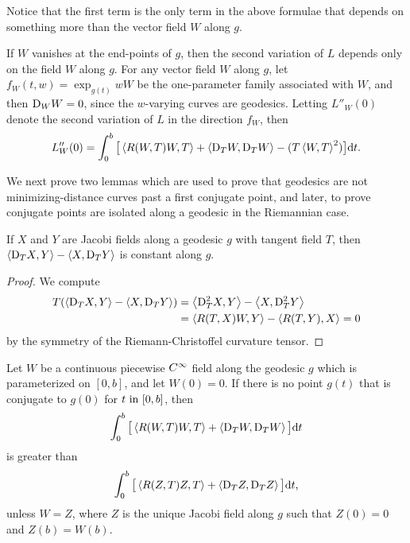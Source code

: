 \documentclass[../main]{subfiles}
\begin{document}
Notice that the first term is the only term in the above formulae that depends on something more than the vector field $W$ along $g$.



\begin{corollary} \label{cor:ch10.2.7}
    If $W$ vanishes at the end-points of $g$, then the second variation of $L$ depends only on the field $W$ along $g$. For any vector field $W$ along $g$, let $f_W(t, w) = \exp_{g(t)}wW$ be the  one-parameter family associated with $W$, and then $\mathrm{D}_W W = 0$, since the $w$-varying curves are geodesics. Letting $L''_W(0)$ denote the second variation of $L$ in the direction $f_W$, then
    \[ L''_W(0) = \int_0^b \big[\left\langle R(W, T)W,T\right\rangle + \left\langle\mathrm{D}_T W,\mathrm{D}_T W\right\rangle - (T\left\langle W,T\right\rangle^2)\big] \mathrm{d}t\text{.} \]
\end{corollary}



We next prove two lemmas which are used to prove that geodesics are not minimizing-distance curves past a first conjugate point, and later, to prove conjugate points are isolated along a geodesic in the Riemannian case.



\begin{lemma} \label{lem:ch10.2.8}
    If $X$ and $Y$ are Jacobi fields along a geodesic $g$ with tangent field $T$, then $\left\langle\mathrm{D}_T X,Y\right\rangle - \left\langle X,\mathrm{D}_T Y\right\rangle$ is constant along $g$.
\end{lemma}

\begin{proof}
    We compute
    \begin{align*}
        T(\left\langle\mathrm{D}_T X,Y\right\rangle - \left\langle X,\mathrm{D}_T Y\right\rangle) &= \left\langle\mathrm{D}_T^2 X,Y\right\rangle - \left\langle X,\mathrm{D}_T^2 Y\right\rangle \\
        &= \left\langle R(T, X)W,Y\right\rangle - \left\langle R(T, Y),X\right\rangle = 0
    \end{align*}%
    by the symmetry of the Riemann-Christoffel curvature tensor.
\end{proof}



\begin{lemma} \label{lem:ch10.2.9}
    Let $W$ be a continuous piecewise $C^\infty$ field along the geodesic $g$ which is parameterized on $[0,b]$, and let $W(0) = 0$. If there is no point $g(t)$ that is conjugate to $g(0)$ for $t \text{ in } [0,b]$, then
    \[ \int_0^b \big[\left\langle R(W,T)W,T\right\rangle + \left\langle\mathrm{D}_T W,\mathrm{D}_T W\right\rangle\big] \mathrm{d}t \]
    is greater than
    \[ \int_0^b \big[\left\langle R(Z, T)Z,T\right\rangle + \left\langle\mathrm{D}_T Z,\mathrm{D}_T Z\right\rangle\big] \mathrm{d}t\text{,} \]
    unless $W = Z$, where $Z$ is the unique Jacobi field along $g$ such that $Z(0) = 0$ and $Z(b) = W(b)$.
\end{lemma}
\end{document}
